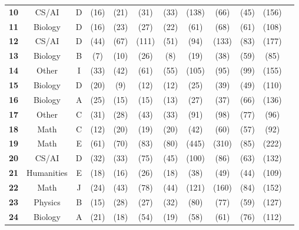 \begin{table*}[htb]
\begin{center}
\begin{tiny}
\begin{tabular}{l|c|c|ccccccccc}
\textbf{10} & CS/AI &D & \X [A] (16) & \X [A] (21) & \X [A] (31) & \X [A] (33) & \X [A] (138) & \X [A] (66) & \X [A] (45) & \X [error] (156)\\
\textbf{11} & Biology &D & \X [A] (16) & \X [A] (23) & \X [A] (27) & \X [A] (22) & \X [B] (61) & \X [C] (68) & \X [A] (61) & \C [D] (108)\\
\textbf{12} & CS/AI &D & \X [A] (44) & \X [A] (67) & \X [error] (111) & \X [E] (51) & \X [A] (94) & \X [A] (133) & \X [H] (83) & \X [B] (177)\\
\textbf{13} & Biology &B & \X [A] (7) & \X [A] (10) & \X [A] (26) & \X [A] (8) & \X [A] (19) & \X [A] (38) & \X [A] (59) & \X [error] (85)\\
\textbf{14} & Other & I & \C [I] (33) & \X [H] (42) & \X [H] (61) & \C [I] (55) & \X [H] (105) & \X [D] (95) & \X [C] (99) & \X [C] (155)\\
\textbf{15} & Biology & D  & \C [D] (20) & \X [B] (9) & \X [B] (12) & \X [B] (12) & \X [B] (25) & \X [B] (39) & \X [B] (49) & \X [C](110)\\
\textbf{16}  & Biology & A  & \X [B] (25) & \X [B] (15) & \X [B] (15) & \X [B] (13) & \X [B] (27) & \X [B] (37) & \X [B] (66) & \X [B] (136)\\
\textbf{17} & Other & C  & \X [B] (31) & \X [A] (28) & \X [B] (43) & \X [B] (33) & \X [B] (91) & \X [B] (98) & \X [B] (77) & \X [error] (96)\\
\textbf{18} & Math  & C  & \X [D] (12) & \X [D] (20) & \X [D] (19) & \X [D] (20) & \X [D] (42) & \X [D] (60) & \X [error] (57) & \X [D] (92)\\
\textbf{19} & Math & E  & \C [E] (61) & \C [E] (70) & \C [E] (83) & \X [None] (80) & \X [C] (445) & \C [E] (310) & \X [error] (85) & \X [C] (222)\\ 
\textbf{20} & CS/AI & D  & \X [A] (32) & \X [A] (33) & \X [python] (75) & \X [A] (45) & \X [A] (100) & \X [A] (86) & \X [A] (63) & \X [A] (132)\\
\textbf{21} & Humanities & E  & \X [D] (18) & \X [D] (16) & \X [D] (26) & \X [D] (18) & \X [D] (38) & \X [D] (49) & \X [error] (44) & \X [B] (109)\\
\textbf{22} & Math & J  & \X [B] (24) & \X [B] (43) & \X [script] (78) & \X [B] (44) & \X [B] (121) & \X [B] (160) & \X [error] (84) & \X [B] (152)\\
\textbf{23} & Physics & B  & \X [D] (15) & \C [B] (28) & \X [D] (27) & \X [D] (32) & \X [D] (80) & \C [B] (77) & \X [D] (59) & \X [D] (127)\\
\textbf{24} & Biology & A  & \X [D] (21) & \X [D] (18) & \X [error] (54) & \X [D] (19) & \X [D] (58) & \X [D] (61) & \X [D] (76) & \X [D] (112)\\

\end{tabular}
\end{tiny}
\end{center}
\end{table*}
